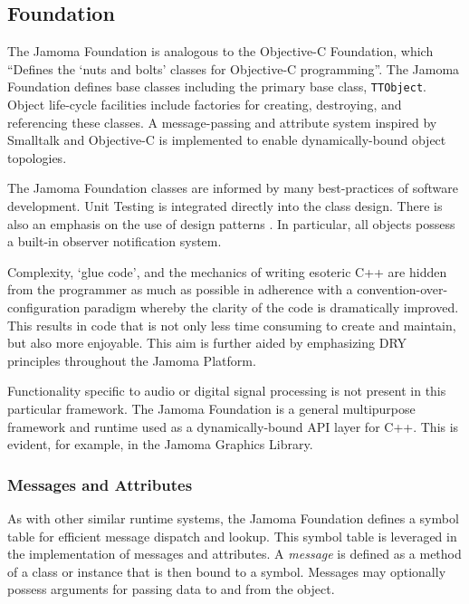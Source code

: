 \documentclass[twoside,10pt]{article}
\begin{document}
\subsection{Foundation} %

The Jamoma Foundation \cite{web7} is analogous to the Objective-C Foundation, which ``Defines the `nuts and bolts' classes for Objective-C programming''\cite{web8}.  The Jamoma Foundation defines base classes including the primary base class, \texttt{\small{TTObject}}.  Object life-cycle facilities include factories for creating, destroying, and referencing these classes.  A message-passing and attribute system inspired by Smalltalk and Objective-C is implemented to enable dynamically-bound object topologies.  

The Jamoma Foundation classes are informed by many best-practices of software development.  Unit Testing is integrated directly into the class design.  There is also an emphasis on the use of design patterns \cite{Gamma:1995}.  In particular, all objects possess a built-in observer notification system.  

Complexity, `glue code', and the mechanics of writing esoteric C++ are hidden from the programmer as much as possible in adherence with a convention-over-configuration paradigm whereby the clarity of the code is dramatically improved.  This results in code that is not only less time consuming to create and maintain, but also more enjoyable.  This aim is further aided by emphasizing DRY principles throughout the Jamoma Platform.

Functionality specific to audio or digital signal processing is not present in this particular framework.  The Jamoma Foundation is a general multipurpose framework and runtime used as a dynamically-bound API layer for C++.  This is evident, for example, in the Jamoma Graphics Library.

\subsubsection{Messages and Attributes} %

As with other similar runtime systems, the Jamoma Foundation defines a symbol table for efficient message dispatch and lookup.  This symbol table is leveraged in the implementation of messages and attributes.  
A \emph{message} is defined as a method of a class or instance that is then bound to a symbol.  Messages may optionally possess arguments for passing data to and from the object.
\end{document}
